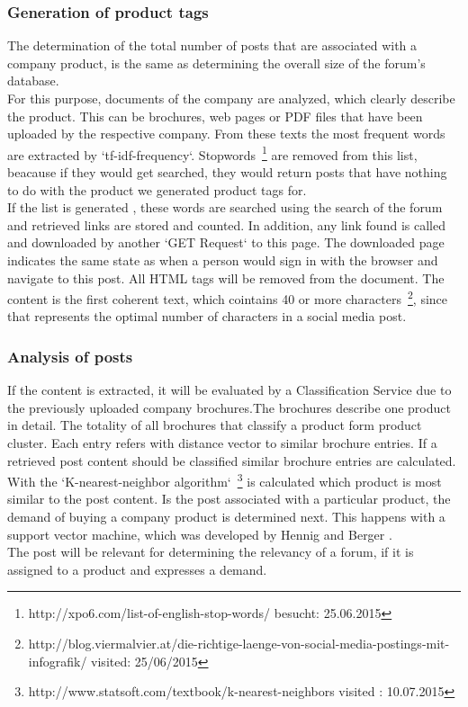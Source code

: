 \subsubsection{Generation of product tags}
The determination of the total number of posts that are associated with a company product, is the same as determining the overall size of the forum's database.\\
For this purpose, documents of the company are analyzed, which clearly describe the product. This can be brochures, web pages or PDF files that have been uploaded by the respective company.
From these texts the most frequent words are extracted by `tf-idf-frequency`. Stopwords~\footnote{http://xpo6.com/list-of-english-stop-words/ besucht: 25.06.2015} are removed from this list, beacause if they would get searched, they would return posts that have nothing to do with the product we generated product tags for.\\
If the list is generated , these words are searched using the search of the forum and retrieved links are stored and counted. In addition, any link found is called and downloaded by another `GET Request` to this page. The downloaded page indicates the same state as when a person would sign in with the browser and navigate to this post.
All HTML tags will be removed from the document. The content is the first coherent text, which cointains 40 or more characters~\footnote{http://blog.viermalvier.at/die-richtige-laenge-von-social-media-postings-mit-infografik/ visited: 25/06/2015}, since that represents the optimal number of characters in a social media post.

\subsubsection{Analysis of posts}
If the content is extracted, it will be evaluated by a Classification Service due to the previously uploaded company brochures.The brochures describe one product in detail.
The totality of all brochures that classify a product form product cluster. Each entry refers with distance vector to similar brochure entries. If a retrieved post content should be classified similar brochure entries are calculated.\\
With the `K-nearest-neighbor algorithm`~\footnote{http://www.statsoft.com/textbook/k-nearest-neighbors visited : 10.07.2015} is calculated which product is most similar to the post content. Is the post associated with a particular product, the demand of buying a company product is determined next. This happens with a support vector machine, which was developed by Hennig and Berger \cite {n2o}. \\
The post will be relevant for determining the relevancy of a forum, if it is assigned to a product and expresses a demand.

